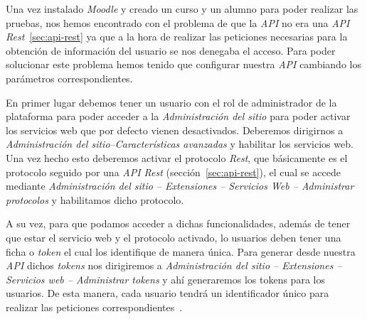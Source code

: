 Una vez instalado \textit{Moodle} y creado un curso y un alumno para poder realizar las pruebas, nos hemos encontrado con el problema de que la \textit{API} no era una \textit{API Rest}~\ref{sec:api-rest} ya que a la hora de realizar las peticiones necesarias para la obtención de información del usuario se nos denegaba el acceso. Para poder solucionar este problema hemos tenido que configurar nuestra \textit{API} cambiando los parámetros correspondientes.

En primer lugar debemos tener un usuario con el rol de administrador de la plataforma para poder acceder a la \textit{Administración del sitio} para poder activar los servicios web que por defecto vienen desactivados. Deberemos dirigirnos a \textit{Administración del sitio--Características avanzadas} y habilitar los servicios web. Una vez hecho esto deberemos activar el protocolo \textit{Rest}, que básicamente es el protocolo seguido por una \textit{API Rest} (sección~\ref{sec:api-rest}), el cual se accede mediante \textit{Administración del sitio -- Extensiones -- Servicios Web -- Administrar protocolos} y habilitamos dicho protocolo.

A su vez, para que podamos acceder a dichas funcionalidades, además de tener que estar el servicio web y el protocolo activado, lo usuarios deben tener una ficha o \textit{token} el cual los identifique de manera única. Para generar desde nuestra \textit{API} dichos \textit{tokens} nos dirigiremos a \textit{Administración del sitio -- Extensiones -- Servicios web -- Administrar tokens} y ahí generaremos los tokens para los usuarios. De esta manera, cada usuario tendrá un identificador único para realizar las peticiones correspondientes~\cite{moodle:api-rest-config}.